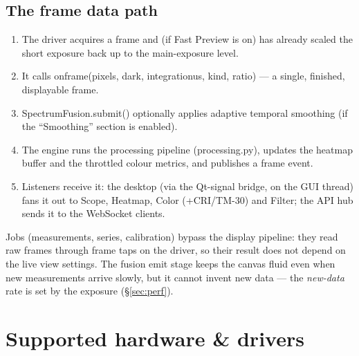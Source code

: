 \documentclass[12pt,a4paper]{article}
\DeclareRobustCommand{\code}[1]{{\ttfamily\small\def\_{\rawus\allowbreak}#1}}
\DeclareRobustCommand{\file}[1]{{\ttfamily\small\def\_{\rawus\allowbreak}#1}}
\begin{document}
\subsection{The frame data path}
\begin{enumerate}
  \item The driver acquires a frame and (if Fast Preview is on) has already scaled
        the short exposure back up to the main-exposure level.
  \item It calls \code{on\_frame(pixels, dark, integration\_us, kind, ratio)} --- a
        single, finished, displayable frame.
  \item \code{SpectrumFusion.submit()} optionally applies adaptive temporal
        smoothing (if the ``Smoothing'' section is enabled).
  \item The engine runs the processing pipeline (\file{processing.py}), updates the
        heatmap buffer and the throttled colour metrics, and publishes a
        \code{frame} event.
  \item Listeners receive it: the desktop (via the Qt-signal bridge, on the GUI
        thread) fans it out to Scope, Heatmap, Color (+CRI/TM-30) and Filter; the
        API hub sends it to the WebSocket clients.
\end{enumerate}
Jobs (measurements, series, calibration) bypass the display pipeline: they read
raw frames through frame taps on the driver, so their result does not depend on
the live view settings. The fusion emit stage keeps the canvas fluid even when new measurements
arrive slowly, but it cannot invent new data --- the \emph{new-data} rate is set by the exposure
(\S\ref{sec:perf}).

\section{Supported hardware \& drivers}
\end{document}
